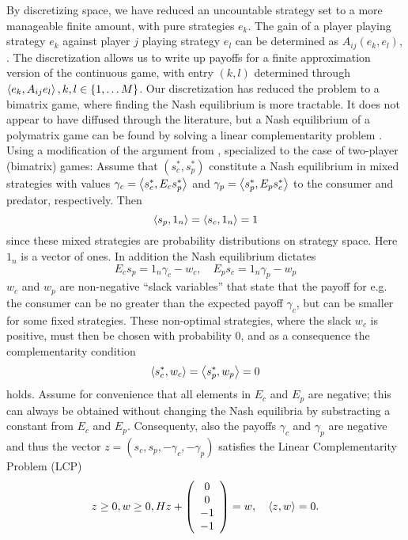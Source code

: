 By discretizing space, we have reduced an uncountable strategy set to a more manageable finite amount, with pure strategies $e_k$. The gain of a player playing strategy $e_k$ against player $j$ playing strategy $e_l$ can be determined as $A_{ij}(e_k,e_l)$, . The discretization allows us to write up payoffs for a finite approximation version of the continuous game,  with entry $(k,l)$ determined through $\left \langle e_k,A_{ij}e_l \right \rangle, k,l \in \{1,\dots M\}$.
Our discretization has reduced the problem to a bimatrix game, where finding the Nash equilibrium is more tractable.
It does not appear to have diffused through the literature, but a Nash equilibrium of a polymatrix game can be found by solving a linear complementarity problem \citep{miller1991copositive}. Using a modification of the argument from \citep{miller1991copositive}, specialized to the case of two-player (bimatrix) games: Assume that $(s^*_c,s^*_p)$ constitute a Nash equilibrium  in mixed strategies with values $\gamma_c = \left \langle s^*_c,E_c s^*_p \right \rangle$ and   $\gamma_p = \left \langle s^*_p,E_p s^*_c \right \rangle$ to the consumer and predator, respectively. Then
\[
  \left \langle s_p,1_n \right \rangle =
  \left \langle s_c,1_n \right \rangle =
  1
\]
since these mixed strategies are probability distributions on strategy space. Here $1_n$ is a vector of ones. In addition the Nash equilibrium dictates
\[
  E_c s_p = 1_n \gamma_c - w_c
  ,\quad
  E_p s_c = 1_n \gamma_p  - w_p
\]
$w_c$ and $w_p$ are non-negative ``slack variables'' that state that the payoff for e.g. the consumer can be no greater than the expected payoff $\gamma_c$, but can be smaller for some fixed strategies. These non-optimal strategies, where the slack $w_c$ is positive, must then be chosen with probability 0, and as a consequence the complementarity condition
\[
  \left \langle s^*_c,w_c \right \rangle =   \left \langle s^*_p,w_p \right \rangle = 0
\]
holds. Assume for convenience that all elements in $E_c$ and $E_p$ are negative; this can always be obtained without changing the Nash equilibria by substracting a constant from $E_c$ and $E_p$. Consequenty, also the payoffs $\gamma_c$ and $\gamma_p$ are negative and thus the vector $z = (s_c,s_p,-\gamma_c,-\gamma_p)$ satisfies the Linear Complementarity Problem (LCP)
\[
\label{eq:lcp}
  z \geq 0,
  w \geq 0 ,
  H
  z
  +
  \left(
    \begin{array}{c}
      0 \\
      0 \\
      -1 \\
      -1
    \end{array}
  \right)
  =
  w
  ,
  \quad
  \left \langle z,w \right \rangle = 0
  .
\]
